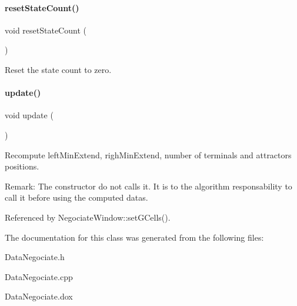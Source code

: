 \mbox{\label{classKite_1_1DataNegociate_af1e8d229bb1dfcff3151d44d42a8549b}} 
\paragraph{\texorpdfstring{reset\+State\+Count()}{resetStateCount()}}
{\footnotesize\ttfamily void reset\+State\+Count (\begin{DoxyParamCaption}{ }\end{DoxyParamCaption})\hspace{0.3cm}{\ttfamily [inline]}}

Reset the state count to zero. \mbox{\label{classKite_1_1DataNegociate_ac5c54df7ed3b930268c8d7752c101725}} 
\paragraph{\texorpdfstring{update()}{update()}}
{\footnotesize\ttfamily void update (\begin{DoxyParamCaption}{ }\end{DoxyParamCaption})}

Recompute {\ttfamily left\+Min\+Extend}, {\ttfamily righ\+Min\+Extend}, number of terminals and attractors positions.

\begin{DoxyParagraph}{Remark\+:}
The constructor do not calls it. It is to the algorithm responsability to call it before using the computed datas. 
\end{DoxyParagraph}


Referenced by Negociate\+Window\+::set\+G\+Cells().



The documentation for this class was generated from the following files\+:\begin{DoxyCompactItemize}
\item 
Data\+Negociate.\+h\item 
Data\+Negociate.\+cpp\item 
Data\+Negociate.\+dox\end{DoxyCompactItemize}
